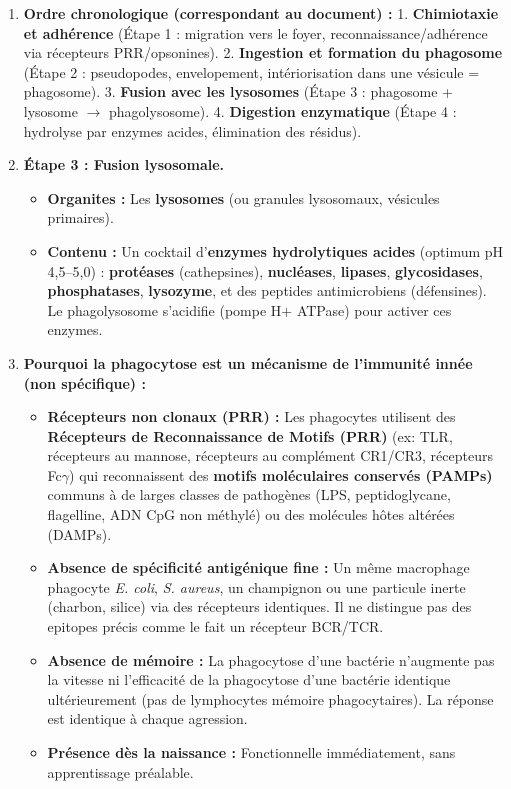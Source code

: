\documentclass[11pt]{article}
\begin{document}
\begin{corrige}
\begin{enumerate}
    \item \textbf{Ordre chronologique (correspondant au document) :}
    1. \textbf{Chimiotaxie et adhérence} (Étape 1 : migration vers le foyer, reconnaissance/adhérence via récepteurs PRR/opsonines).
    2. \textbf{Ingestion et formation du phagosome} (Étape 2 : pseudopodes, envelopement, intériorisation dans une vésicule = phagosome).
    3. \textbf{Fusion avec les lysosomes} (Étape 3 : phagosome + lysosome $\rightarrow$ phagolysosome).
    4. \textbf{Digestion enzymatique} (Étape 4 : hydrolyse par enzymes acides, élimination des résidus).
    \item \textbf{Étape 3 : Fusion lysosomale.}
    \begin{itemize}
        \item \textbf{Organites :} Les \textbf{lysosomes} (ou granules lysosomaux, vésicules primaires).
        \item \textbf{Contenu :} Un cocktail d'\textbf{enzymes hydrolytiques acides} (optimum pH 4,5--5,0) : \textbf{protéases} (cathepsines), \textbf{nucléases}, \textbf{lipases}, \textbf{glycosidases}, \textbf{phosphatases}, \textbf{lysozyme}, et des peptides antimicrobiens (défensines). Le phagolysosome s'acidifie (pompe H+ ATPase) pour activer ces enzymes.
    \end{itemize}
    \item \textbf{Pourquoi la phagocytose est un mécanisme de l'immunité innée (non spécifique) :}
    \begin{itemize}
        \item \textbf{Récepteurs non clonaux (PRR) :} Les phagocytes utilisent des \textbf{Récepteurs de Reconnaissance de Motifs (PRR)} (ex: TLR, récepteurs au mannose, récepteurs au complément CR1/CR3, récepteurs Fc$\gamma$) qui reconnaissent des \textbf{motifs moléculaires conservés (PAMPs)} communs à de larges classes de pathogènes (LPS, peptidoglycane, flagelline, ADN CpG non méthylé) ou des molécules hôtes altérées (DAMPs).
        \item \textbf{Absence de spécificité antigénique fine :} Un même macrophage phagocyte \emph{E. coli}, \emph{S. aureus}, un champignon ou une particule inerte (charbon, silice) via des récepteurs identiques. Il ne distingue pas des epitopes précis comme le fait un récepteur BCR/TCR.
        \item \textbf{Absence de mémoire :} La phagocytose d'une bactérie n'augmente pas la vitesse ni l'efficacité de la phagocytose d'une bactérie identique ultérieurement (pas de lymphocytes mémoire phagocytaires). La réponse est identique à chaque agression.
        \item \textbf{Présence dès la naissance :} Fonctionnelle immédiatement, sans apprentissage préalable.
    \end{itemize}
\end{enumerate}
\end{corrige}
\end{document}

